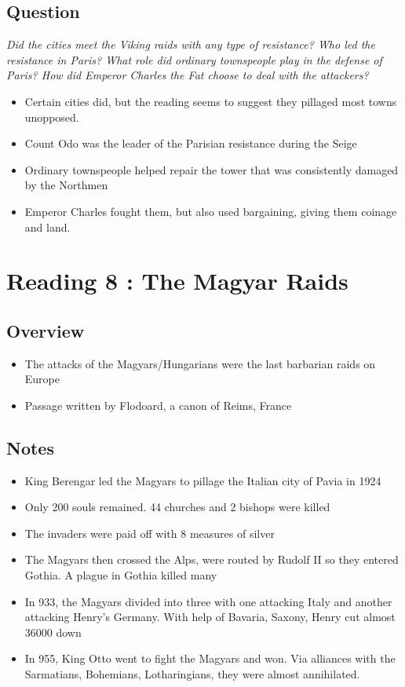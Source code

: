 \documentclass[12pt]{article}
\begin{document}
\subsection*{Question}

\begin{center}
	\textit{Did the cities meet the Viking raids with any type of resistance? Who led the resistance in Paris? What role did ordinary townspeople play in the defense of Paris? How did Emperor Charles the Fat choose to deal with the attackers?}
\end{center}

\begin{itemize}
	\item Certain cities did, but the reading seems to suggest they pillaged most towns unopposed. 
	\item Count Odo was the leader of the Parisian resistance during the Seige
	\item Ordinary townspeople helped repair the tower that was consistently damaged by the Northmen
	\item Emperor Charles fought them, but also used bargaining, giving them coinage and land.
\end{itemize}


\section*{Reading 8 : The Magyar Raids}

\subsection*{Overview}

\begin{itemize}
	\item The attacks of the Magyars/Hungarians were the last barbarian raids on Europe
	\item Passage written by Flodoard, a canon of Reims, France
\end{itemize}

\subsection*{Notes}

\begin{itemize}
	\item King Berengar led the Magyars to pillage the Italian city of Pavia in 1924
	\item Only 200 souls remained. 44 churches and 2 bishops were killed
	\item The invaders were paid off with 8 measures of silver
	\item The Magyars then crossed the Alps, were routed by Rudolf II so they entered Gothia. A plague in Gothia killed many
	\item In 933, the Magyars divided into three with one attacking Italy and another attacking Henry's Germany. With help of Bavaria, Saxony, Henry cut almost 36000 down
	\item In 955, King Otto went to fight the Magyars and won. Via alliances with the Sarmatians, Bohemians, Lotharingians, they were almost annihilated.
\end{itemize}
\end{document}
